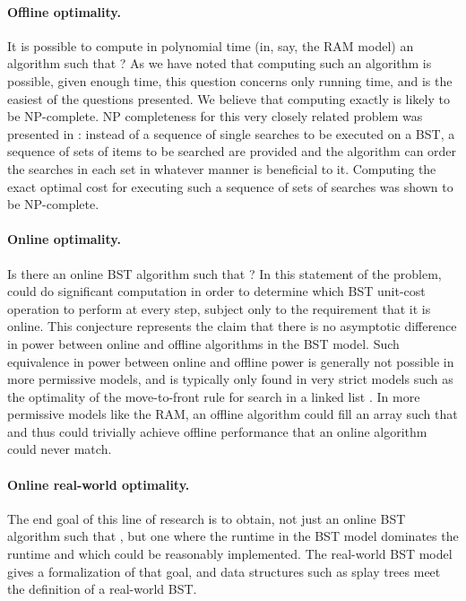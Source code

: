 \documentclass[11pt]{article}
\begin{document}
\paragraph{Offline optimality.} It is possible to compute in polynomial time (in, say, the RAM model) an algorithm  such that ? As we have noted that computing such an algorithm is possible, given enough time, this question concerns only running time, and is the easiest of the questions presented. We believe that computing  exactly is likely to be NP-complete. NP completeness for this very closely related problem was presented in \cite{DBLP:conf/soda/DemaineHIKP09}: instead of a sequence of single searches to be executed on a BST, a sequence of sets of items to be searched are provided and the algorithm can order the searches in each set in whatever manner is beneficial to it. Computing the exact optimal cost for executing such a sequence of sets of searches was shown to be NP-complete. 

\paragraph{Online optimality.} Is there an online BST algorithm  such that ?
In this statement of the problem,  could do significant computation in order to determine which BST unit-cost operation to perform at every step, subject only to the requirement that it is online. This conjecture represents the claim that there is no asymptotic difference in power between online and offline algorithms in the BST model. Such equivalence in power between online and offline power is generally not possible in more permissive models, and is typically only found in very strict models such as the optimality of the move-to-front rule for search in a linked list \cite{DBLP:journals/cacm/SleatorT85}. In more permissive models like the RAM, an offline algorithm could fill an array  such that  and thus could trivially achieve offline performance that an online algorithm could never match. 


\paragraph{Online real-world optimality.} The end goal of this line of research is to obtain, not just an online BST algorithm  such that , but one where the runtime in the BST model dominates the runtime and which could be reasonably implemented. The real-world BST model gives a formalization of that goal, and data structures such as splay trees meet the definition of a real-world BST.
\end{document}
